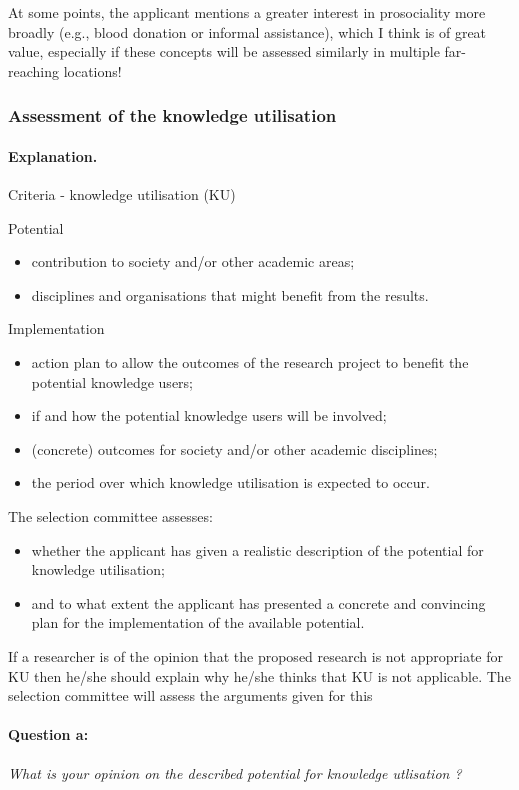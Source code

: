 \documentclass[twocolumn, serif, rga, numeric]{jote-article}
\begin{document}
At some points, the applicant mentions a greater interest in prosociality more broadly (e.g., blood donation or informal assistance), which I think is of great value, especially if these concepts will be assessed similarly in multiple far-reaching locations!
 {}\subsubsection*{Assessment of the knowledge utilisation} 
\paragraph{Explanation.}
Criteria - knowledge utilisation (KU)

\noindent Potential 
\begin{itemize}
\item contribution to society and/or other academic areas; \item disciplines and organisations that might benefit from the results. 
\end{itemize}
Implementation \begin{itemize}

\item action plan to allow the outcomes of the research project to benefit the potential knowledge users; \item if and how the potential knowledge users will be involved; \item (concrete) outcomes for society and/or other academic disciplines;\item the period over which knowledge utilisation is expected to occur. 
\end{itemize}
The selection committee assesses: 
\begin{itemize}


\item whether the applicant has given a realistic description of the potential for knowledge utilisation; \item and to what extent the applicant has presented a concrete and convincing plan for the implementation of the available potential. 
\end{itemize}

If a researcher is of the opinion that the proposed research is not appropriate for KU then he/she should explain why he/she thinks that KU is not applicable. The selection committee will assess the arguments given for this
\paragraph{Question a:}
\textit{What is your opinion on the described potential for knowledge utlisation ?}
\end{document}
